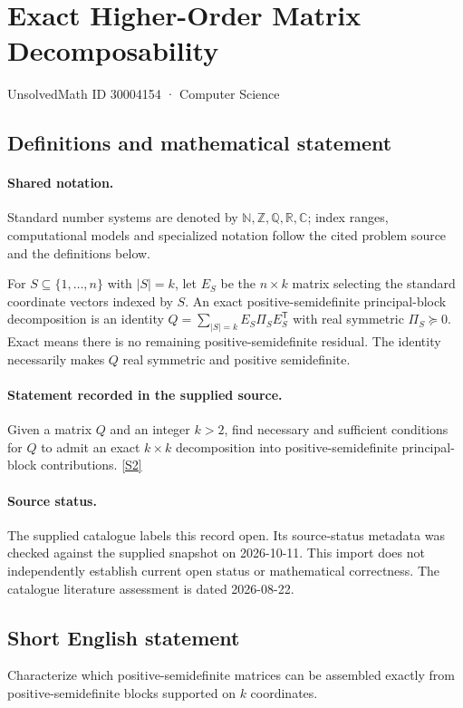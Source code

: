 \documentclass[11pt]{article}
\newcommand{\sref}[2]{\hyperlink{source:#1:#2}{[S#2]}}
\begin{document}
\setcounter{section}{30004153}
\section{Exact Higher-Order Matrix Decomposability}\label{30004154}
{\small\sffamily UnsolvedMath ID 30004154 · Computer Science}
\subsection{Definitions and mathematical statement}

\paragraph{Shared notation.}Standard number systems are denoted by $\mathbb N,\mathbb Z,\mathbb Q,\mathbb R,\mathbb C$; index ranges, computational models and specialized notation follow the cited problem source and the definitions below.


For $S\subseteq\{1,\ldots,n\}$ with $|S|=k$, let $E_S$ be the $n\times k$ matrix selecting the standard coordinate vectors indexed by $S$. An exact positive-semidefinite principal-block decomposition is an identity $Q=\sum_{|S|=k}E_S\Pi_SE_S^{\mathsf T}$ with real symmetric $\Pi_S\succeq0$. Exact means there is no remaining positive-semidefinite residual. The identity necessarily makes $Q$ real symmetric and positive semidefinite.
\paragraph{Statement recorded in the supplied source.}
Given a matrix $Q$ and an integer $k>2$, find necessary and sufficient conditions for $Q$ to admit an exact $k\times k$ decomposition into positive-semidefinite principal-block contributions. \sref{30004154}{2}
\paragraph{Source status.}
The supplied catalogue labels this record open. Its source-status metadata was checked against the supplied snapshot on 2026-10-11. This import does not independently establish current open status or mathematical correctness. The catalogue literature assessment is dated 2026-08-22.
\subsection{Short English statement}
Characterize which positive-semidefinite matrices can be assembled exactly from positive-semidefinite blocks supported on $k$ coordinates.
\end{document}
